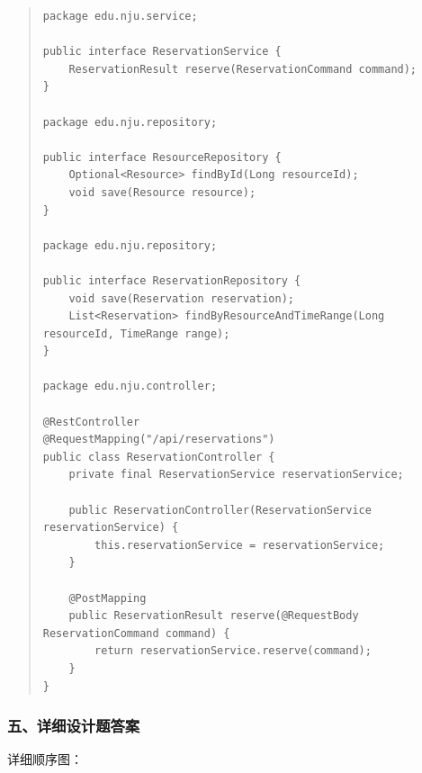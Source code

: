 \documentclass[UTF8,zihao=-4]{ctexart}
\begin{document}
\begin{quote}
\footnotesize
\begin{verbatim}
package edu.nju.service;

public interface ReservationService {
    ReservationResult reserve(ReservationCommand command);
}

package edu.nju.repository;

public interface ResourceRepository {
    Optional<Resource> findById(Long resourceId);
    void save(Resource resource);
}

package edu.nju.repository;

public interface ReservationRepository {
    void save(Reservation reservation);
    List<Reservation> findByResourceAndTimeRange(Long resourceId, TimeRange range);
}

package edu.nju.controller;

@RestController
@RequestMapping("/api/reservations")
public class ReservationController {
    private final ReservationService reservationService;

    public ReservationController(ReservationService reservationService) {
        this.reservationService = reservationService;
    }

    @PostMapping
    public ReservationResult reserve(@RequestBody ReservationCommand command) {
        return reservationService.reserve(command);
    }
}
\end{verbatim}
\end{quote}


\subsubsection*{五、详细设计题答案}


详细顺序图：
\end{document}
